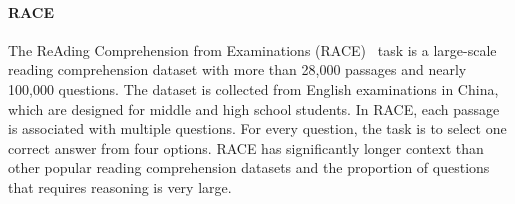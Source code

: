 \paragraph{RACE} \label{sec:race}
The ReAding Comprehension from Examinations (RACE)~\cite{lai2017large} task is a large-scale reading comprehension dataset with more than 28,000 passages and nearly 100,000 questions. The dataset is collected from English examinations in China, which are designed for middle and high school students. In RACE, each passage is associated with multiple questions. For every question, the task is to select one correct answer from four options. RACE has significantly longer context than other popular reading comprehension datasets and the proportion of questions
that requires reasoning is very large.